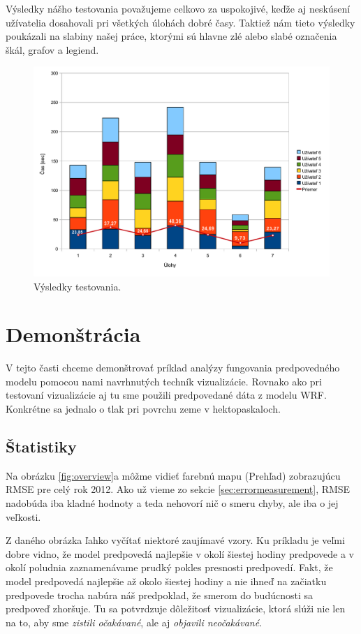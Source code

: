 Výsledky nášho testovania považujeme celkovo za uspokojivé, keďže aj neskúsení užívatelia dosahovali pri všetkých úlohách dobré časy. Taktiež nám tieto výsledky poukázali na slabiny našej práce, ktorými sú hlavne zlé alebo slabé označenia škál, grafov a legiend.

\begin{figure}
	\centering
	\includegraphics[width = 5in]{resultchart}
	\caption{Výsledky testovania.}
	\label{fig:results} 
\end{figure}

\section{Demonštrácia}
V tejto časti chceme demonštrovať príklad analýzy fungovania predpovedného modelu pomocou nami navrhnutých techník vizualizácie. Rovnako ako pri testovaní vizualizácie aj tu sme použili predpovedané dáta z modelu WRF. Konkrétne sa jednalo o tlak pri povrchu zeme v hektopaskaloch.

\subsection{Štatistiky}
Na obrázku \ref{fig:overview}a môžme vidieť farebnú mapu (Prehľad) zobrazujúcu RMSE pre celý rok 2012. Ako už vieme zo sekcie \ref{sec:errormeasurement}, RMSE nadobúda iba kladné hodnoty a teda nehovorí nič o smeru chyby, ale iba o jej veľkosti. 

Z daného obrázka ľahko vyčítať niektoré zaujímavé vzory. Ku príkladu je veľmi dobre vidno, že model predpovedá najlepšie v okolí šiestej hodiny predpovede a v okolí poludnia zaznamenávame prudký pokles presnosti predpovedí. Fakt, že model predpovedá najlepšie až okolo šiestej hodiny a nie ihneď na začiatku predpovede trocha nabúra náš predpoklad, že smerom do budúcnosti sa predpoveď zhoršuje. Tu sa potvrdzuje dôležitosť vizualizácie, ktorá slúži nie len na to, aby sme \textit{zistili očakávané}, ale aj \textit{objavili neočakávané}.

